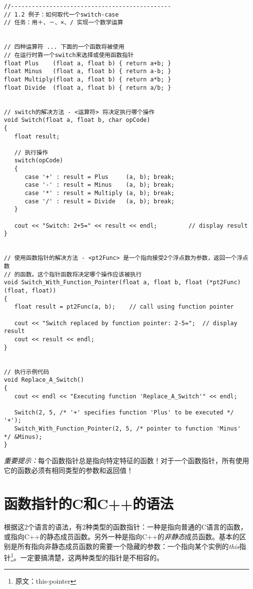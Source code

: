 \documentclass[11pt,a4paper]{article}
\begin{document}
\lstset{escapechar=@,style=customc}

\begin{lstlisting}
//----------------------------------------------
// 1.2 例子：如何取代一个switch-case
// 任务：用＋、－、×、/ 实现一个数学运算


// 四种运算符 ... 下面的一个函数将被使用
// 在运行时靠一个switch来选择或使用函数指针
float Plus    (float a, float b) { return a+b; }
float Minus   (float a, float b) { return a-b; }
float Multiply(float a, float b) { return a*b; }
float Divide  (float a, float b) { return a/b; }


// switch的解决方法 - <运算符> 将决定执行哪个操作
void Switch(float a, float b, char opCode)
{
   float result;

   // 执行操作
   switch(opCode)
   {
      case '+' : result = Plus     (a, b); break;
      case '-' : result = Minus    (a, b); break;
      case '*' : result = Multiply (a, b); break;
      case '/' : result = Divide   (a, b); break;
   }

   cout << "Switch: 2+5=" << result << endl;         // display result
}


// 使用函数指针的解决方法 - <pt2Func> 是一个指向接受2个浮点数为参数，返回一个浮点数
// 的函数。这个指针函数将决定哪个操作应该被执行
void Switch_With_Function_Pointer(float a, float b, float (*pt2Func)(float, float))
{
   float result = pt2Func(a, b);    // call using function pointer

   cout << "Switch replaced by function pointer: 2-5=";  // display result
   cout << result << endl;
}


// 执行示例代码
void Replace_A_Switch()
{
   cout << endl << "Executing function 'Replace_A_Switch'" << endl;

   Switch(2, 5, /* '+' specifies function 'Plus' to be executed */ '+');
   Switch_With_Function_Pointer(2, 5, /* pointer to function 'Minus' */ &Minus);
}
\end{lstlisting}

\emph{重要提示：}每个函数指针总是指向特定特征的函数！对于一个函数指针，所有使用它的函数必须有相同类型的参数和返回值！
\section{函数指针的C和C++的语法}
根据这2个语言的语法，有2种类型的函数指针：一种是指向普通的C语言的函数，或指向C++的静态成员函数。另外一种是指向C++的\emph{非静态}成员函数。基本的区别是所有指向非静态成员函数的需要一个隐藏的参数：一个指向某个实例的\textit{this}指针\footnote{原文：this-pointer}。一定要搞清楚，这两种类型的指针是不相容的。
\end{document}
